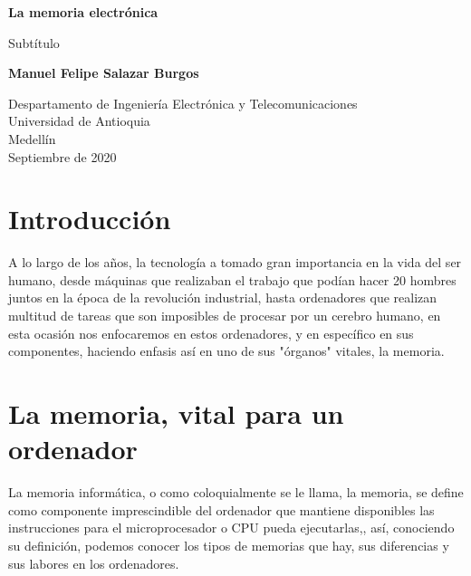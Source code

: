 \documentclass{article}
\begin{document}
\begin{titlepage}
    \begin{center}
        \vspace*{1cm}
            
        \Huge
        \textbf{La memoria electrónica}
            
        \vspace{0.5cm}
        \LARGE
        Subtítulo
            
        \vspace{1.5cm}
            
        \textbf{Manuel Felipe Salazar Burgos}
            
        \vfill
            
        \vspace{0.8cm}
            
        \Large
        Despartamento de Ingeniería Electrónica y Telecomunicaciones\\
        Universidad de Antioquia\\
        Medellín\\
        Septiembre de 2020
            
    \end{center}
\end{titlepage}

\tableofcontents
\newpage
\section{Introducción}\label{intro}
A lo largo de los años, la tecnología a tomado gran importancia en la vida del ser humano, desde máquinas que realizaban el trabajo que podían hacer 20 hombres juntos en la época de la revolución industrial, hasta ordenadores que realizan multitud de tareas que son imposibles de procesar por un cerebro humano, en esta ocasión nos enfocaremos en estos ordenadores, y en específico en sus componentes, haciendo enfasis así en uno de sus "órganos" vitales, la memoria.

\section{La memoria, vital para un ordenador} \label{memory}
La memoria informática, o como coloquialmente se le llama, la memoria, se define como componente imprescindible del ordenador que mantiene disponibles las instrucciones para el microprocesador o CPU pueda ejecutarlas,\cite{https://www.ecured.cu/Memoria_(inform}, así, conociendo su definición, podemos conocer los tipos de memorias que hay, sus diferencias y sus labores en los ordenadores.
\end{document}
